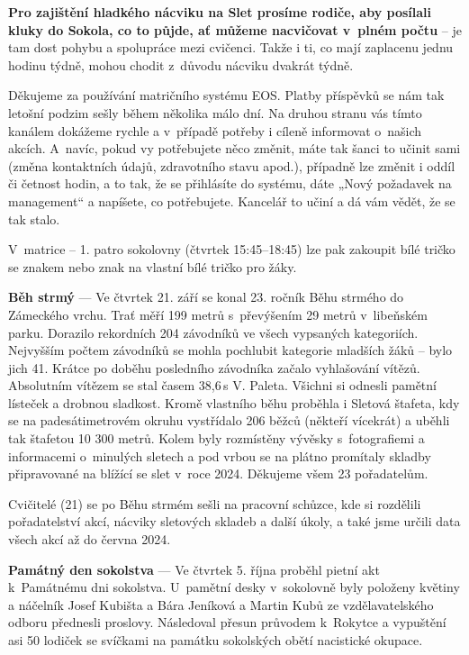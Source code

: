 \documentclass[11pt]{article}
\begin{document}
\textbf{Pro zajištění hladkého nácviku na Slet prosíme rodiče, aby posílali kluky do Sokola, co to půjde, ať můžeme nacvičovat v~plném počtu} – je tam dost pohybu a spolupráce mezi cvičenci. Takže i ti, co mají zaplacenu jednu hodinu týdně, mohou chodit z~důvodu nácviku dvakrát týdně.

Děkujeme za používání matričního systému EOS. Platby příspěvků se nám tak letošní podzim sešly během několika málo dní. Na druhou stranu vás tímto kanálem dokážeme rychle a v~případě potřeby i cíleně informovat o~našich akcích. A~navíc, pokud vy potřebujete něco změnit, máte tak šanci to učinit sami (změna kontaktních údajů, zdravotního stavu apod.), případně lze změnit i oddíl či četnost hodin, a to tak, že se přihlásíte do systému, dáte „Nový požadavek na management“ a napíšete, co potřebujete. Kancelář to učiní a dá vám vědět, že se tak stalo.

V~matrice – 1. patro sokolovny (čtvrtek 15:45–18:45) lze pak zakoupit bílé tričko se znakem nebo znak na vlastní bílé tričko pro žáky.

\textbf{Běh strmý} --- Ve čtvrtek 21. září se konal 23. ročník Běhu strmého do Zámeckého vrchu. Trať měří 199 metrů s~převýšením 29 metrů v~libeňském parku. Dorazilo rekordních 204 závodníků ve všech vypsaných kategoriích. Nejvyšším počtem závodníků se mohla pochlubit kategorie mladších žáků – bylo jich 41. Krátce po doběhu posledního závodníka začalo vyhlašování vítězů. Absolutním vítězem se stal časem 38,6\,s V. Paleta. Všichni si odnesli pamětní lísteček a drobnou sladkost. Kromě vlastního běhu proběhla i Sletová štafeta, kdy se na padesátimetrovém okruhu vystřídalo 206 běžců (někteří vícekrát) a uběhli tak štafetou 10 300 metrů. Kolem byly rozmístěny vývěsky s~fotografiemi a informacemi o~minulých sletech a pod vrbou se na plátno promítaly skladby připravované na blížící se slet v~roce 2024. Děkujeme všem 23 pořadatelům.

Cvičitelé (21) se po Běhu strmém sešli na pracovní schůzce, kde si rozdělili pořadatelství akcí, nácviky sletových skladeb a další úkoly, a také jsme určili data všech akcí až do června 2024.

\vspace*{12pt}
\noindent
\textbf{Památný den sokolstva} --- Ve čtvrtek 5. října proběhl pietní akt k~Památnému dni sokolstva. U~pamětní desky v~sokolovně byly položeny květiny a náčelník Josef Kubišta a Bára Jeníková a Martin Kubů ze vzdělavatelského odboru přednesli proslovy. Následoval přesun průvodem k~Rokytce a vypuštění asi 50 lodiček se svíčkami na památku sokolských obětí nacistické okupace.
\end{document}
